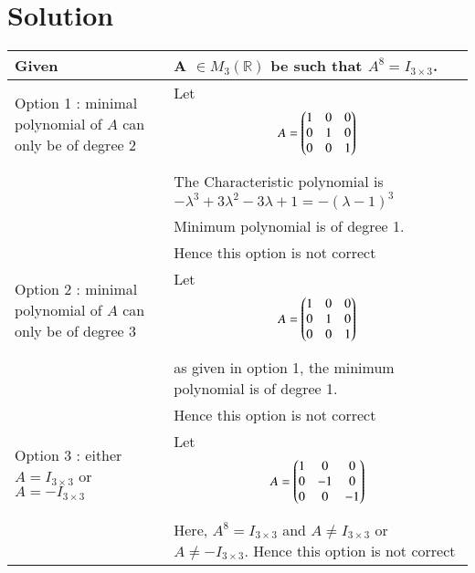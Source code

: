 \documentclass[journal,12pt,twocolumn]{IEEEtran}
\begin{document}
\section{Solution}
\begin{table}[h!]
\begin{center}
\begin{tabular}{ | m{3cm} | m{5cm}| } \hline 
Given  &   A $\in M_3 (\mathbb{R}) $ be such that $A^8 = I_{3 \times 3}$.\\  
  \hline
Option 1 :  minimal polynomial of $A$ can only be of degree 2 & Let {\begin{align*}
 A = \begin{pmatrix}1&0&0\\0&1&0\\0&0&1\end{pmatrix}
\end{align*}}\\&
The Characteristic polynomial is $ -\lambda^3+3\lambda^2-3\lambda+1=-(\lambda-1)^3$\\&
Minimum polynomial is of degree 1. \\&Hence this option is not correct\\  \hline
Option 2 :  minimal polynomial of $A$ can only be of degree 3 & Let {\begin{align*}
 A = \begin{pmatrix}1&0&0\\0&1&0\\0&0&1\end{pmatrix}
\end{align*}}\\&
as given in option 1, the minimum polynomial is of degree 1.\\& Hence this option is not correct\\  \hline
Option 3 :  either $A = I_{3 \times 3}$ or $A = -I_{ 3 \times 3}$ & Let {\begin{align*}
 A = \begin{pmatrix}1&0&0\\0&-1&0\\0&0&-1\end{pmatrix}
\end{align*}}\\&
Here, $A^8 = I_{3 \times 3}$ and $ A \neq I_{3 \times 3}$ or $A \neq -I_{ 3 \times 3}$. Hence this option is not correct\\  \hline
\end{tabular}
\end{center}
\end{table}
\end{document}
